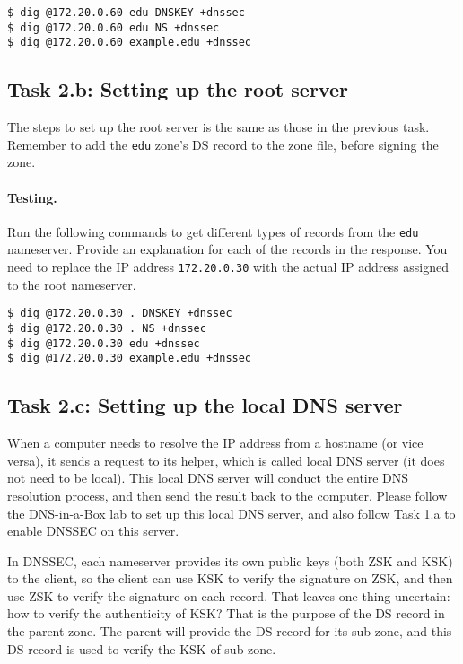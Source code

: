 \begin{lstlisting}
$ dig @172.20.0.60 edu DNSKEY +dnssec
$ dig @172.20.0.60 edu NS +dnssec
$ dig @172.20.0.60 example.edu +dnssec
\end{lstlisting}



\subsection{Task 2.b: Setting up the root server} 

The steps to set up the root server is the same as those in the 
previous task. Remember to add the \texttt{edu} zone's DS record 
to the zone file, before signing the zone.  


\paragraph{Testing.}
Run the following commands to get different types of records
from the \texttt{edu} nameserver. Provide an explanation
for each of the records in the response. You need to
replace the IP address \texttt{172.20.0.30} with the actual
IP address assigned to the root nameserver.


\begin{lstlisting}
$ dig @172.20.0.30 . DNSKEY +dnssec
$ dig @172.20.0.30 . NS +dnssec
$ dig @172.20.0.30 edu +dnssec
$ dig @172.20.0.30 example.edu +dnssec
\end{lstlisting}



\subsection{Task 2.c: Setting up the local DNS server} 


When a computer needs to resolve the IP address from a hostname (or vice versa),
it sends a request to its helper, which is called local DNS server (it
does not need to be local).  This local DNS server will conduct the
entire DNS resolution process, and then send the result back to the computer.
Please follow the DNS-in-a-Box lab to set up this local DNS server, and also
follow Task 1.a to enable DNSSEC on this server. 

In DNSSEC, each nameserver provides its own public keys (both ZSK and KSK) to
the client, so the client can use KSK to verify the signature on ZSK, and then use ZSK to 
verify the signature on each record. That leaves one thing uncertain: how to verify
the authenticity of KSK? That is the purpose of the DS record in the parent zone. 
The parent will provide the DS record for its sub-zone, and this DS record is used 
to verify the KSK of sub-zone. 

